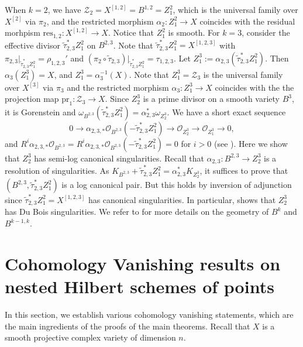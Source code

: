 \documentclass{amsart}
\theoremstyle{plain}
\theoremstyle{definition}
\theoremstyle{remark}
\newcommand{\res}{\textrm{res}}
\newcommand{\pr}{\textrm{pr}}
\begin{document}
\medskip

When $k=2$, we have $\mathcal{Z}_2 = X^{[1,2]} = B^{1,2} = Z_1^2$, which is the universal family over $X^{[2]}$ via $\pi_2$, and the restricted morphism $\alpha_2 \colon Z_1^2 \to X$ coincides with the residual morhpism $\res_{1,2} \colon X^{[1,2]} \to X$. Notice that $Z_1^2$ is smooth. 
For $k=3$, consider the effective divisor $\widetilde{\tau}_{2,3}^* Z_1^2$ on $B^{2,3}$. Note that $\widetilde{\tau}_{2,3}^* Z_1^2 = X^{[1,2,3]}$ with 
$\pi_{2,3}|_{\widetilde{\tau}_{2,3}^* Z_1^2} = \rho_{1,2,3}'$ and $(\pi_2 \circ \widetilde{\tau}_{2,3})|_{\widetilde{\tau}_{2,3}^* Z_1^2} = \tau_{1,2,3}$. Let $Z_1^3:=\alpha_{2,3}(\widetilde{\tau}_{2,3}^*Z_1^2)$. Then $\alpha_3(Z_1^3)=X$, and $Z_1^3 = \alpha_3^{-1}(X)$. Note that $Z_1^3 = \mathcal{Z}_3$ is the universal family over $X^{[3]}$ via $\pi_3$ and the restricted morphism $\alpha_3 \colon Z_1^3 \to X$ coincides with the the projection map $\pr_1 \colon \mathcal{Z}_3 \to X$.
 Since $Z_2^3$ is a prime divisor on a smooth variety $B^3$, it is Gorenstein and $\omega_{B^{2,3}}(\widetilde{\tau}_{2,3}^* Z_1^2) = \alpha_{2,3}^* \omega_{Z_2^3}$.
We have a short exact sequence
$$
0 \longrightarrow \alpha_{2,3,*} \mathcal{O}_{B^{2,3}}(-\widetilde{\tau}_{2,3}^* Z_1^2) \longrightarrow \mathcal{O}_{Z_2^3} \longrightarrow \mathcal{O}_{Z_1^3} \longrightarrow 0,
$$
and $R^i \alpha_{2,3,*} \mathcal{O}_{B^{2,3}} = R^i \alpha_{2,3,*} \mathcal{O}_{B^{2,3}}(-\widetilde{\tau}_{2,3}^* Z_1^2) = 0$ for $i>0$ (see \cite[Subsection 2.2]{Choi.Park.26}). Here we show that $Z_2^3$ has semi-log canonical singularities. Recall that $\alpha_{2,3} \colon B^{2,3} \to Z_2^3$ is a resolution of singularities. As $K_{B^{2,3}} +  \widetilde{\tau}_{2,3}^* Z_1^2 = \alpha_{2,3}^* K_{Z_2^3}$, it suffices to prove that $(B^{2,3},  \widetilde{\tau}_{2,3}^* Z_1^2)$ is a log canonical pair. But this holds by inversion of adjunction since $\widetilde{\tau}_{2,3}^* Z_1^2 = X^{[1,2,3]}$ has canonical singularities. In particular, \cite[Corollary 6.32]{Kollar.13} shows that $Z_2^3$ has Du Bois singularities.  
We refer to \cite[Sections 2 and 3]{Choi.Lacini.Park.Sheridan.25} for more details on the geometry of $B^k$ and $B^{k-1,k}$. 



\section{Cohomology Vanishing results on nested Hilbert schemes of points}\label{sec:mainvanishing}

\noindent In this section, we establish various cohomology vanishing statements, which are the main ingredients of the proofs of the main theorems. Recall that $X$ is a smooth projective complex variety of dimension $n$. 
\end{document}
